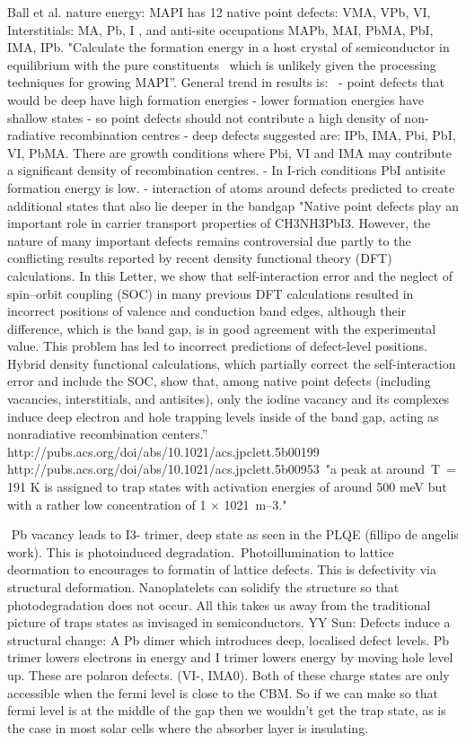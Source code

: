 Ball et al. nature energy: MAPI has 12 native point defects: VMA, VPb, VI, Interstitials: MA, Pb, I , and anti-site occupations MAPb, MAI, PbMA, PbI, IMA, IPb. "Calculate the formation energy in a host crystal of semiconductor in equilibrium with the pure constituents  which is unlikely given the processing techniques for growing MAPI”. General trend in results is:
 - point defects that would be deep have high formation energies
- lower formation energies have shallow states
- so point defects should not contribute a high density of non-radiative recombination centres
- deep defects suggested are: IPb, IMA, Pbi, PbI, VI, PbMA. There are growth conditions where Pbi, VI and IMA may contribute a significant density of recombination centres.
- In I-rich conditions PbI antisite formation energy is low.
- interaction of atoms around defects predicted to create additional states that also lie deeper in the bandgap
"Native point defects play an important role in carrier transport properties of CH3NH3PbI3. However, the nature of many important defects remains controversial due partly to the conflicting results reported by recent density functional theory (DFT) calculations. In this Letter, we show that self-interaction error and the neglect of spin–orbit coupling (SOC) in many previous DFT calculations resulted in incorrect positions of valence and conduction band edges, although their difference, which is the band gap, is in good agreement with the experimental value. This problem has led to incorrect predictions of defect-level positions. Hybrid density functional calculations, which partially correct the self-interaction error and include the SOC, show that, among native point defects (including vacancies, interstitials, and antisites), only the iodine vacancy and its complexes induce deep electron and hole trapping levels inside of the band gap, acting as nonradiative recombination centers.” http://pubs.acs.org/doi/abs/10.1021/acs.jpclett.5b00199
http://pubs.acs.org/doi/abs/10.1021/acs.jpclett.5b00953 "a peak at around T = 191 K is assigned to trap states with activation energies of around 500 meV but with a rather low concentration of 1 × 1021 m–3."

 Pb vacancy leads to I3- trimer, deep state as seen in the PLQE (fillipo de angelis work). This is photoinduced degradation. Photoillumination to lattice deormation to encourages to formatin of lattice defects. This is defectivity via structural deformation. Nanoplatelets can solidify the structure so that photodegradation does not occur. All this takes us away from the traditional picture of traps states as invisaged in semiconductors.
YY Sun:	
Defects induce a structural change: A Pb dimer which introduces deep, localised defect levels. Pb trimer lowers electrons in energy and I trimer lowers energy by moving hole level up. These are polaron defects. (VI-, IMA0).  Both of these charge states are only accessible when the fermi level is close to the CBM. So if we can make so that fermi level is at the middle of the gap then we wouldn’t get the trap state, as is the case in most solar cells where the absorber layer is insulating.


